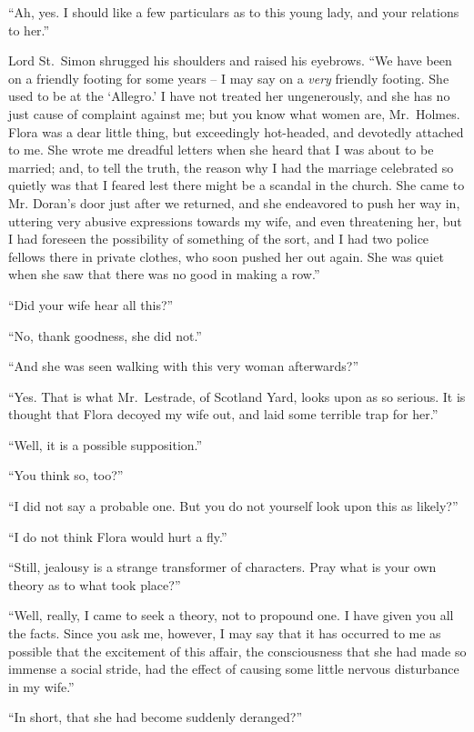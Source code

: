 “Ah, yes. I should like a few particulars as to this young
lady, and your relations to her.”

Lord St.~Simon shrugged his shoulders and raised his eyebrows.
“We have been on a friendly footing for some years -- I
may say on a \textit{very} friendly footing. She used to be at
the ‘Allegro.’ I have not treated her ungenerously, and she
has no just cause of complaint against me; but you know
what women are, Mr.~Holmes. Flora was a dear little thing,
but exceedingly hot-headed, and devotedly attached to me.
She wrote me dreadful letters when she heard that I was
about to be married; and, to tell the truth, the reason why I
had the marriage celebrated so quietly was that I feared lest
there might be a scandal in the church. She came to Mr.
Doran’s door just after we returned, and she endeavored to
push her way in, uttering very abusive expressions towards
my wife, and even threatening her, but I had foreseen the
possibility of something of the sort, and I had two police fellows
there in private clothes, who soon pushed her out again.
She was quiet when she saw that there was no good in making
a row.”

“Did your wife hear all this?”

“No, thank goodness, she did not.”

“And she was seen walking with this very woman
afterwards?”

“Yes. That is what Mr.~Lestrade, of Scotland Yard, looks
upon as so serious. It is thought that Flora decoyed my
wife out, and laid some terrible trap for her.”

“Well, it is a possible supposition.”

“You think so, too?”

“I did not say a probable one. But you do not yourself
look upon this as likely?”

“I do not think Flora would hurt a fly.”

“Still, jealousy is a strange transformer of characters. Pray
what is your own theory as to what took place?”

“Well, really, I came to seek a theory, not to propound one.
I have given you all the facts. Since you ask me, however,
I may say that it has occurred to me as possible that the
excitement of this affair, the consciousness that she had made
so immense a social stride, had the effect of causing some little
nervous disturbance in my wife.”

“In short, that she had become suddenly deranged?”

